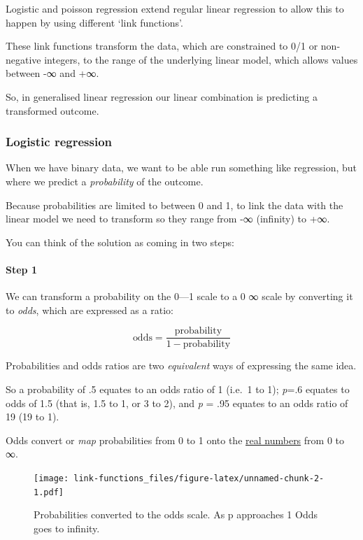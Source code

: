 \documentclass[]{article}
\let\oldparagraph\paragraph
\renewcommand{\paragraph}[1]{\oldparagraph{#1}\mbox{}}
\theoremstyle{definition}
\theoremstyle{definition}
\theoremstyle{definition}
\theoremstyle{remark}
\begin{document}
Logistic and poisson regression extend regular linear regression to
allow this to happen by using different `link functions'.

These link functions transform the data, which are constrained to 0/1 or
non-negative integers, to the range of the underlying linear model,
which allows values between -∞ and +∞.

So, in generalised linear regression our linear combination is
predicting a transformed outcome.

\subsubsection*{Logistic regression}\label{logistic-link-function}

When we have binary data, we want to be able run something like
regression, but where we predict a \emph{probability} of the outcome.

Because probabilities are limited to between 0 and 1, to link the data
with the linear model we need to transform so they range from -∞
(infinity) to +∞.

You can think of the solution as coming in two steps:

\paragraph{Step 1}\label{step-1}

We can transform a probability on the 0---1 scale to a 0 \rightarrow ∞
scale by converting it to \emph{odds}, which are expressed as a ratio:

\[\textrm{odds} = \dfrac{\textrm{probability}}{1-\textrm{probability}}\]

Probabilities and odds ratios are two \emph{equivalent} ways of
expressing the same idea.

So a probability of .5 equates to an odds ratio of 1 (i.e.~1 to 1);
\emph{p}=.6 equates to odds of 1.5 (that is, 1.5 to 1, or 3 to 2), and
\emph{p} = .95 equates to an odds ratio of 19 (19 to 1).

Odds convert or \emph{map} probabilities from 0 to 1 onto the
\href{http://en.wikipedia.org/wiki/Real_number}{real numbers} from 0 to
∞.

\begin{figure}
\centering
\texttt{[image: link-functions\_files/figure-latex/unnamed-chunk-2-1.pdf]}
\caption{\label{fig:unnamed-chunk-2}Probabilities converted to the odds
scale. As p approaches 1 Odds goes to infinity.}
\end{figure}
\end{document}
